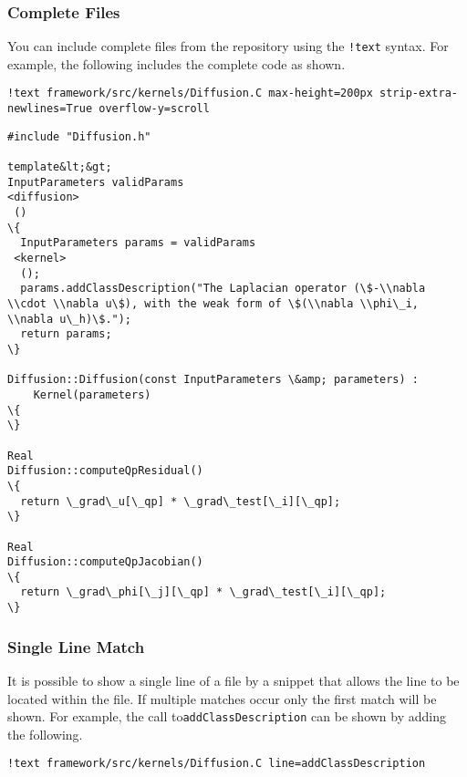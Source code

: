 \documentclass[]{report}
\begin{document}
\subsubsection{Complete Files\label{complete-files}}
\par
You can include complete files from the repository using the \texttt{!text} syntax. For example, the following
includes the complete code as shown.\begin{lstlisting}
!text framework/src/kernels/Diffusion.C max-height=200px strip-extra-newlines=True overflow-y=scroll
\end{lstlisting}
\par
\begin{lstlisting}[caption=\href{https://github.com/idaholab/moose/blob/master/framework/src/kernels/Diffusion.C}{framework/src/kernels/Diffusion.C}]
#include "Diffusion.h"

template&lt;&gt;
InputParameters validParams
<diffusion>
 ()
\{
  InputParameters params = validParams
 <kernel>
  ();
  params.addClassDescription("The Laplacian operator (\$-\\nabla \\cdot \\nabla u\$), with the weak form of \$(\\nabla \\phi\_i, \\nabla u\_h)\$.");
  return params;
\}

Diffusion::Diffusion(const InputParameters \&amp; parameters) :
    Kernel(parameters)
\{
\}

Real
Diffusion::computeQpResidual()
\{
  return \_grad\_u[\_qp] * \_grad\_test[\_i][\_qp];
\}

Real
Diffusion::computeQpJacobian()
\{
  return \_grad\_phi[\_j][\_qp] * \_grad\_test[\_i][\_qp];
\}
\end{lstlisting}\subsubsection{Single Line Match\label{single-line-match}}
\par
It is possible to show a single line of a file by a snippet that allows the line to be located within
the file. If multiple matches occur only the first match will be shown. For example, the call to\texttt{addClassDescription} can be shown by adding the following.\begin{lstlisting}
!text framework/src/kernels/Diffusion.C line=addClassDescription
\end{lstlisting}
\end{document}
